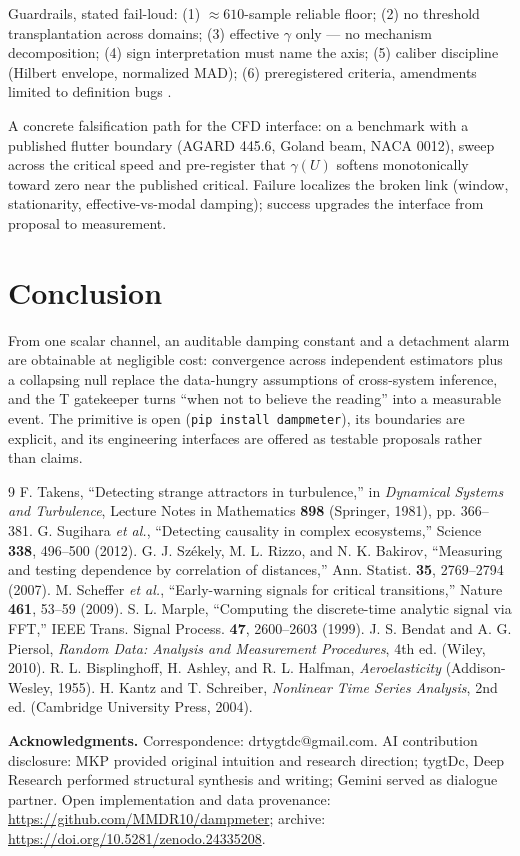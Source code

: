 \documentclass[10pt,twocolumn]{article}
\begin{document}
Guardrails, stated fail-loud: (1) $\approx 610$-sample reliable floor;
(2) no threshold transplantation across domains; (3) effective $\gamma$ only
--- no mechanism decomposition; (4) sign interpretation must name the axis;
(5) caliber discipline (Hilbert envelope, normalized MAD); (6) preregistered
criteria, amendments limited to definition bugs \cite{Kantz}.

A concrete falsification path for the CFD interface: on a benchmark with a
published flutter boundary (AGARD 445.6, Goland beam, NACA 0012), sweep
across the critical speed and pre-register that $\gamma(U)$ softens
monotonically toward zero near the published critical. Failure localizes
the broken link (window, stationarity, effective-vs-modal damping);
success upgrades the interface from proposal to measurement.

\section{Conclusion}

From one scalar channel, an auditable damping constant and a detachment
alarm are obtainable at negligible cost: convergence across independent
estimators plus a collapsing null replace the data-hungry assumptions of
cross-system inference, and the T gatekeeper turns ``when not to believe
the reading'' into a measurable event. The primitive is open
(\texttt{pip install dampmeter}), its boundaries are explicit, and its
engineering interfaces are offered as testable proposals rather than
claims.

\begin{thebibliography}{9}
F. Takens, ``Detecting strange attractors in turbulence,'' in
\emph{Dynamical Systems and Turbulence}, Lecture Notes in Mathematics
\textbf{898} (Springer, 1981), pp. 366--381.
G. Sugihara \emph{et al.}, ``Detecting causality in complex ecosystems,''
Science \textbf{338}, 496--500 (2012).
G. J. Sz\'ekely, M. L. Rizzo, and N. K. Bakirov, ``Measuring and testing
dependence by correlation of distances,'' Ann. Statist. \textbf{35},
2769--2794 (2007).
M. Scheffer \emph{et al.}, ``Early-warning signals for critical
transitions,'' Nature \textbf{461}, 53--59 (2009).
S. L. Marple, ``Computing the discrete-time analytic signal via FFT,''
IEEE Trans. Signal Process. \textbf{47}, 2600--2603 (1999).
J. S. Bendat and A. G. Piersol, \emph{Random Data: Analysis and
Measurement Procedures}, 4th ed. (Wiley, 2010).
R. L. Bisplinghoff, H. Ashley, and R. L. Halfman, \emph{Aeroelasticity}
(Addison-Wesley, 1955).
H. Kantz and T. Schreiber, \emph{Nonlinear Time Series Analysis},
2nd ed. (Cambridge University Press, 2004).
\end{thebibliography}

\bigskip
\noindent\textbf{Acknowledgments.} Correspondence: drtygtdc@gmail.com.
AI contribution disclosure: MKP provided original intuition and research
direction; tygtDc, Deep Research performed structural synthesis and
writing; Gemini served as dialogue partner. Open implementation and data
provenance: \url{https://github.com/MMDR10/dampmeter};
archive: \url{https://doi.org/10.5281/zenodo.24335208}.
\end{document}
